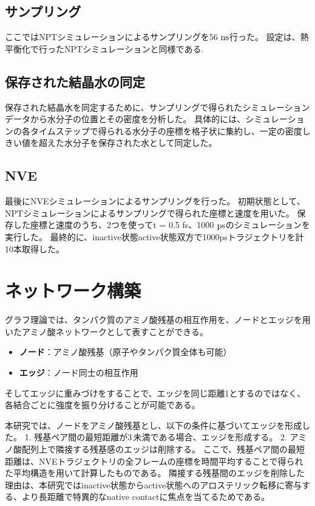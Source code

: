 \subsection{サンプリング}
ここではNP\gamma Tシミュレーションによるサンプリングを56 $\rm{ns}$行った。
設定は、熱平衡化で行ったNP\gamma Tシミュレーションと同様である.

\subsection{保存された結晶水の同定}
保存された結晶水を同定するために、サンプリングで得られたシミュレーションデータから水分子の位置とその密度を分析した。
具体的には、シミュレーションの各タイムステップで得られる水分子の座標を格子状に集約し、一定の密度しきい値を超えた水分子を保存された水として同定した。

\subsection{NVE}
最後にNVEシミュレーションによるサンプリングを行った。
初期状態として、NP\gamma Tシミュレーションによるサンプリングで得られた座標と速度を用いた。
保存した座標と速度のうち、2つを使って\Delta t = 0.5 fs、1000 $\rm{ps}$のシミュレーションを実行した。
最終的に、inactive状態active状態双方で1000psトラジェクトリを計10本取得した。

\section{ネットワーク構築}
グラフ理論では、タンパク質のアミノ酸残基の相互作用を、ノードとエッジを用いたアミノ酸ネットワークとして表すことができる。
\begin{itemize}
  \item \textbf{ノード}：アミノ酸残基（原子やタンパク質全体も可能）
  \item \textbf{エッジ}：ノード同士の相互作用
\end{itemize}

そしてエッジに重みづけをすることで、エッジを同じ距離1とするのではなく、各結合ごとに強度を振り分けることが可能である。

本研究では、ノードをアミノ酸残基とし、以下の条件に基づいてエッジを形成した。
1. 残基ペア間の最短距離が3\,\text{\AA}未満である場合、エッジを形成する。
2. アミノ酸配列上で隣接する残基感のエッジは削除する。
ここで、残基ペア間の最短距離は、NVEトラジェクトリの全フレームの座標を時間平均することで得られた平均構造を用いて計算したものである。
隣接する残基間のエッジを削除した理由は、本研究ではinactive状態からactive状態へのアロステリック転移に寄与する、より長距離で特異的なnative contactに焦点を当てるためである。

